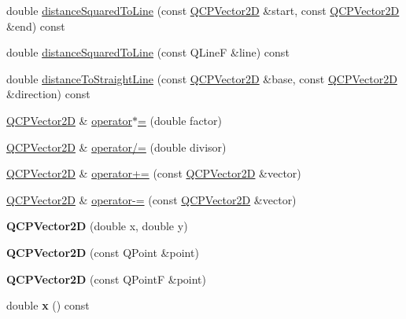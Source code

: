 \begin{DoxyCompactItemize}
\item 
double \hyperlink{class_q_c_p_vector2_d_a0f85a9c351640a4e0fc3c2a1a42d5d0c}{distance\+Squared\+To\+Line} (const \hyperlink{class_q_c_p_vector2_d}{Q\+C\+P\+Vector2D} \&start, const \hyperlink{class_q_c_p_vector2_d}{Q\+C\+P\+Vector2D} \&end) const 
\item 
double \hyperlink{class_q_c_p_vector2_d_a465aa1d96ae076bf33a7ec6cc49722be}{distance\+Squared\+To\+Line} (const Q\+LineF \&line) const 
\item 
double \hyperlink{class_q_c_p_vector2_d_a29e8472875754769397f0d47d727be41}{distance\+To\+Straight\+Line} (const \hyperlink{class_q_c_p_vector2_d}{Q\+C\+P\+Vector2D} \&base, const \hyperlink{class_q_c_p_vector2_d}{Q\+C\+P\+Vector2D} \&direction) const 
\item 
\hyperlink{class_q_c_p_vector2_d}{Q\+C\+P\+Vector2D} \& \hyperlink{class_q_c_p_vector2_d_aa52a246d168f475a4231c7bdfdac7df1}{operator$\ast$=} (double factor)
\item 
\hyperlink{class_q_c_p_vector2_d}{Q\+C\+P\+Vector2D} \& \hyperlink{class_q_c_p_vector2_d_aefa55eb9282c066a330ca281881e0ec0}{operator/=} (double divisor)
\item 
\hyperlink{class_q_c_p_vector2_d}{Q\+C\+P\+Vector2D} \& \hyperlink{class_q_c_p_vector2_d_aa2c34754ce8839b2d074dec741783c5e}{operator+=} (const \hyperlink{class_q_c_p_vector2_d}{Q\+C\+P\+Vector2D} \&vector)
\item 
\hyperlink{class_q_c_p_vector2_d}{Q\+C\+P\+Vector2D} \& \hyperlink{class_q_c_p_vector2_d_a3a2e906bb924983bb801e89f28a3d566}{operator-\/=} (const \hyperlink{class_q_c_p_vector2_d}{Q\+C\+P\+Vector2D} \&vector)
\item 
{\bfseries Q\+C\+P\+Vector2D} (double x, double y)\hypertarget{class_q_c_p_vector2_d_a47bd86cebc5588dad6ec84349d9098d4}{}\label{class_q_c_p_vector2_d_a47bd86cebc5588dad6ec84349d9098d4}

\item 
{\bfseries Q\+C\+P\+Vector2D} (const Q\+Point \&point)\hypertarget{class_q_c_p_vector2_d_ad8f30a064dc37c90a7ba5e6732ceb5bb}{}\label{class_q_c_p_vector2_d_ad8f30a064dc37c90a7ba5e6732ceb5bb}

\item 
{\bfseries Q\+C\+P\+Vector2D} (const Q\+PointF \&point)\hypertarget{class_q_c_p_vector2_d_a3c16eba1006c210ffc3299253fef2339}{}\label{class_q_c_p_vector2_d_a3c16eba1006c210ffc3299253fef2339}

\item 
double {\bfseries x} () const \hypertarget{class_q_c_p_vector2_d_a731b487c2bf4afb5c51937619a27d49e}{}\label{class_q_c_p_vector2_d_a731b487c2bf4afb5c51937619a27d49e}


\end{DoxyCompactItemize}
